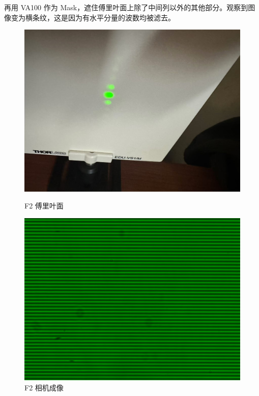 \documentclass{ctexart}
\begin{document}
再用 VA100 作为 Mask，遮住傅里叶面上除了中间列以外的其他部分。观察到图像变为横条纹，这是因为有水平分量的波数均被滤去。
\begin{figure}[H]
  \centering
  \begin{minipage}[b]{0.2\textwidth}
    \centering
    \includegraphics[width=\textwidth]{pictures/微信图片_20241017164802.jpg}
    \caption{F2 傅里叶面}
  \end{minipage}
  \hspace{0.1\textwidth} %
  \begin{minipage}[b]{0.3\textwidth}
    \centering
    \includegraphics[width=\textwidth]{pictures/F2-mask-Ex9.png}
    \caption{F2 相机成像}
  \end{minipage}
\end{figure}
\end{document}
